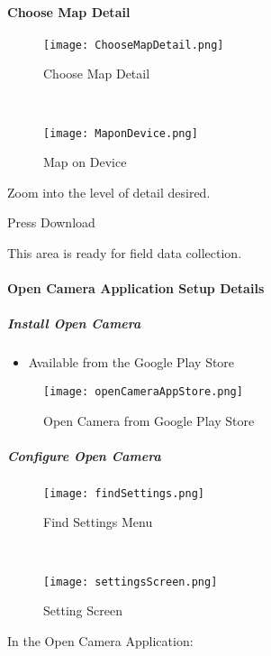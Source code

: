 \paragraph[Choose Map Detail]{Choose Map Detail\texorpdfstring{\\}{}}
\begin{wrapfigure}{r}{0.5\textwidth}
\centering
    \texttt{[image: ChooseMapDetail.png]}
\caption{Choose Map Detail}
\vspace{.25in}

\HRule \\[.4cm] %
\vspace{.25in}

    \texttt{[image: MaponDevice.png]}
\caption{Map on Device}
\end{wrapfigure}
Zoom into the level of detail desired.
\vspace{.5in}

\noindent Press Download
\vspace{3.5in}

\noindent This area is ready for field data collection.
\clearpage
\paragraph{Open Camera Application Setup Details}
\subparagraph{Install Open Camera}
\begin{itemize}
\item Available from the Google Play Store
\end{itemize}
\begin{figure}[h!]
\centering
    \texttt{[image: openCameraAppStore.png]}
\caption{Open Camera from Google Play Store}
\end{figure}
\clearpage
\subparagraph{Configure Open Camera}
\begin{wrapfigure}{r}{0.5\textwidth}
\centering
    \texttt{[image: findSettings.png]}
\caption{Find Settings Menu}
\vspace{.25in}

\HRule \\[.4cm] %
\vspace{.25in}

    \texttt{[image: settingsScreen.png]}
\caption{Setting Screen}
\end{wrapfigure}
In the Open Camera Application:
\vspace{1in}

